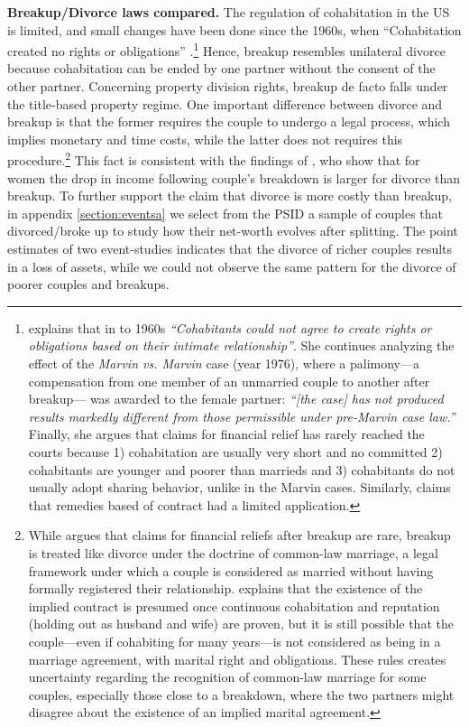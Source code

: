 \documentclass[12pt]{article}
\numberwithin{table}{section}
\begin{document}
\textbf{Breakup/Divorce laws compared.} The regulation of cohabitation in the US is limited, and small changes have been done since the 1960s, when “Cohabitation created no rights or obligations” \citep{garrison2008}.\footnote{\cite{garrison2008} explains that in to 1960s \textit{“Cohabitants could not agree to create rights or obligations based on their intimate relationship”}. She continues analyzing the effect of the \textit{Marvin vs. Marvin} case (year 1976), where a palimony---a compensation from one member of an unmarried couple to another after breakup--- was awarded to the female partner: \textit{“[the case] has not produced results markedly different from those permissible under pre-Marvin case law.”} Finally, she argues that claims for financial relief has rarely reached the courts because 1) cohabitation are usually very short and no committed 2) cohabitants are younger and poorer than marrieds and 3) cohabitants do not usually adopt sharing behavior, unlike in the Marvin cases. Similarly, \cite{bowman2004} claims that remedies based of contract had a limited application.} Hence, breakup resembles unilateral divorce because cohabitation can be ended by one partner without the consent of the other partner. Concerning property division rights, breakup de facto falls under the title-based property regime. One important difference between divorce and breakup is that the former requires the couple to undergo a legal process, which implies monetary and time costs, while the latter does not requires this procedure.\footnote{While \cite{garrison2008} argues that claims for financial reliefs after breakup are rare, breakup is treated like divorce under the doctrine of common-law marriage, a legal framework under which a couple is considered as married without having formally registered their relationship. \cite{goran2008} explains that the existence of the implied contract is presumed once continuous cohabitation and reputation (holding out as husband and wife) are proven, but it is still possible that the couple---even if cohabiting for many years---is not considered as being in a marriage agreement, with marital right and obligations. These rules creates uncertainty regarding the recognition of common-law marriage for some couples, especially those close to a breakdown, where the two partners might disagree about the existence of an implied marital agreement.} This fact is consistent with the findings of \cite{avellar2005}, who show that for women the drop in income following couple's breakdown is larger for divorce than breakup. To further support the claim that divorce is more costly than breakup, in appendix \ref{section:eventsa} we select from the PSID a sample of couples that divorced/broke up to study how their net-worth evolves after splitting. The point estimates of two event-studies indicates that the divorce of richer couples results in a loss of assets, while we could not observe the same pattern for the divorce of poorer couples and breakups.
\end{document}
